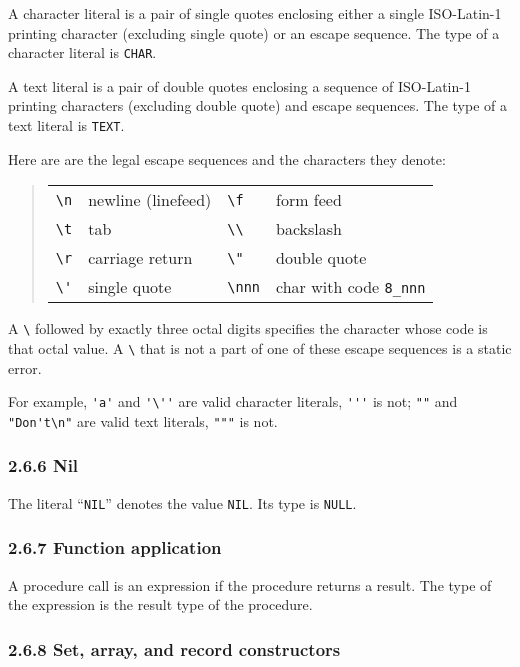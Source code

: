 \documentclass[10pt]{article}
\begin{document}
A character literal is a pair of single quotes enclosing either a single
ISO-Latin-1 printing character (excluding single quote) or an escape sequence.
The type of a character literal is \verb|CHAR|.

A text literal is a pair of double quotes enclosing a sequence of ISO-Latin-1
printing characters (excluding double quote) and escape sequences.  The type
of a text literal is \verb|TEXT|.

Here are are the legal escape sequences and the characters they denote:
\begin{quote}
  \begin{tabular}{llll}
    \verb|\n| & newline (linefeed) & \verb|\f| & form feed \\
    \verb|\t| & tab                & \verb|\\| & backslash \\
    \verb|\r| & carriage return    & \verb|\"| & double quote \\
    \verb|\'| & single quote       & \verb|\nnn| & char with code \verb|8_nnn| \\
  \end{tabular}
\end{quote}
A \verb|\| followed by exactly three octal digits specifies the character
whose code is that octal value.  A \verb|\| that is not a part of one of these
escape sequences is a static error.

For example, \verb|'a'| and \verb|'\''| are valid character literals,
\verb|'''| is not; \verb|""| and \verb|"Don't\n"| are valid text literals,
\verb|"""| is not.

\subsubsection*{2.6.6 Nil}

The literal ``\verb|NIL|'' denotes the value \verb|NIL|.  Its type is
\verb|NULL|.

\subsubsection*{2.6.7 Function application}

A procedure call is an expression if the procedure returns a result.  The type
of the expression is the result type of the procedure.

\subsubsection*{2.6.8 Set, array, and record constructors}
\end{document}

